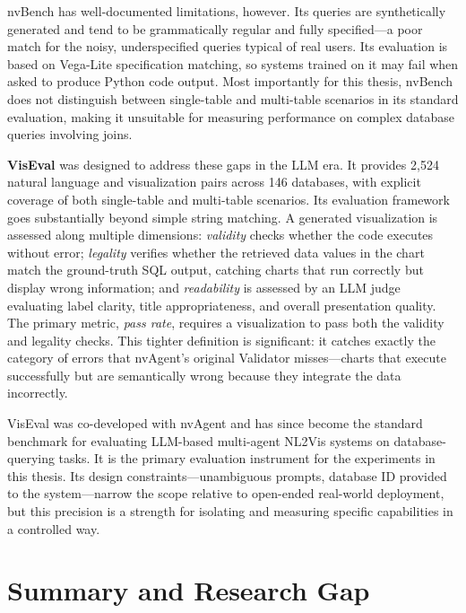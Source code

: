 \documentclass[a4paper,oneside,bibliography=totoc]{scrbook}
\begin{document}
nvBench has well-documented limitations, however. Its queries are synthetically generated and tend to be grammatically regular and fully specified---a poor match for the noisy, underspecified queries typical of real users. Its evaluation is based on Vega-Lite specification matching, so systems trained on it may fail when asked to produce Python code output. Most importantly for this thesis, nvBench does not distinguish between single-table and multi-table scenarios in its standard evaluation, making it unsuitable for measuring performance on complex database queries involving joins.

\textbf{VisEval} \cite{chen2025viseval} was designed to address these gaps in the LLM era. It provides 2{,}524 natural language and visualization pairs across 146 databases, with explicit coverage of both single-table and multi-table scenarios. Its evaluation framework goes substantially beyond simple string matching. A generated visualization is assessed along multiple dimensions: \emph{validity} checks whether the code executes without error; \emph{legality} verifies whether the retrieved data values in the chart match the ground-truth SQL output, catching charts that run correctly but display wrong information; and \emph{readability} is assessed by an LLM judge evaluating label clarity, title appropriateness, and overall presentation quality. The primary metric, \emph{pass rate}, requires a visualization to pass both the validity and legality checks. This tighter definition is significant: it catches exactly the category of errors that nvAgent's original Validator misses---charts that execute successfully but are semantically wrong because they integrate the data incorrectly.

VisEval was co-developed with nvAgent and has since become the standard benchmark for evaluating LLM-based multi-agent NL2Vis systems on database-querying tasks. It is the primary evaluation instrument for the experiments in this thesis. Its design constraints---unambiguous prompts, database ID provided to the system---narrow the scope relative to open-ended real-world deployment, but this precision is a strength for isolating and measuring specific capabilities in a controlled way.

\section{Summary and Research Gap}
\label{sec:gap}
\end{document}

